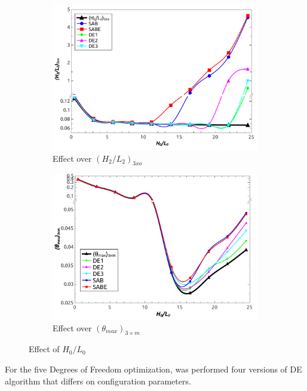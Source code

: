 \documentclass[10pt,fleqn,a4paper,twoside]{article}
\begin{document}
\begin{figure}[h]
\centering
	\begin{subfigure}{0.52\textwidth}
		\centering
		\includegraphics[width=1\linewidth]{imgs/h0l0_h2l2_en.png}
		\caption{ {\small Effect over $(H_{2}/L_{2})_{3xo}$}}
		\label{figure02:sub1}
	\end{subfigure}%
	\begin{subfigure}{0.52\textwidth}
		\centering
		\includegraphics[width=1\linewidth]{imgs/h0l0_tmim_en}
		\caption{ {\small Effect over $({\theta}_{max})_{3\times m}$}}
		\label{figure02:sub2}
	\end{subfigure}%
\caption{Effect of $H_{0}/L_{0}$}
\label{figure02}
\end{figure}

For the five Degrees of Freedom optimization, was performed four versions of DE algorithm that differs on configuration parameters. 
\end{document}
